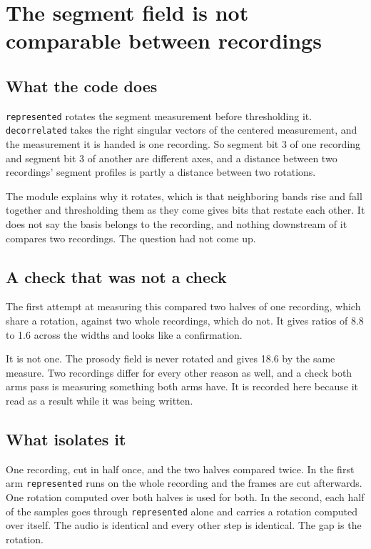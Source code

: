\section{The segment field is not comparable between recordings}

\subsection{What the code does}

\texttt{represented} rotates the segment measurement before thresholding it.
\texttt{decorrelated} takes the right singular vectors of the centered measurement, and the
measurement it is handed is one recording. So segment bit 3 of one recording and segment bit 3 of
another are different axes, and a distance between two recordings' segment profiles is partly a
distance between two rotations.

The module explains why it rotates, which is that neighboring bands rise and fall together and
thresholding them as they come gives bits that restate each other. It does not say the basis belongs
to the recording, and nothing downstream of it compares two recordings. The question had not come
up.

\subsection{A check that was not a check}

The first attempt at measuring this compared two halves of one recording, which share a rotation,
against two whole recordings, which do not. It gives ratios of 8.8 to 1.6 across the widths and
looks like a confirmation.

It is not one. The prosody field is never rotated and gives 18.6 by the same measure. Two recordings
differ for every other reason as well, and a check both arms pass is measuring something both arms
have. It is recorded here because it read as a result while it was being written.

\subsection{What isolates it}

One recording, cut in half once, and the two halves compared twice. In the first arm
\texttt{represented} runs on the whole recording and the frames are cut afterwards. One rotation
computed over both halves is used for both. In the second, each half of the samples goes through
\texttt{represented} alone and carries a rotation computed over itself. The audio is identical and
every other step is identical. The gap is the rotation.

